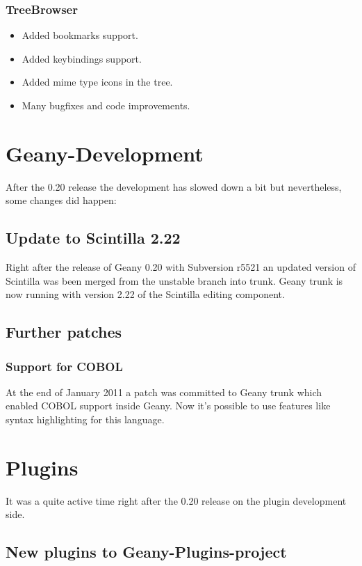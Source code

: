 \documentclass[%
paper=a4,%
fontsize=12pt,%
twoside=false,%
DIV18,
headsepline,
plainheadsepline,
footsepline,
plainfootsepline,
parskip=half,%
openany,%
]{scrartcl}
\begin{document}
\subsubsection{TreeBrowser}
\begin{itemize}
	\item Added bookmarks support.
	\item Added keybindings support.
	\item Added mime type icons in the tree.
	\item Many bugfixes and code improvements.
\end{itemize}

\section{Geany-Development}

After the 0.20 release the development has slowed down a bit but
nevertheless, some changes did happen:

\subsection{Update to Scintilla 2.22}

Right after the release of Geany 0.20 with Subversion r5521 an
updated version of Scintilla was been merged from the unstable branch
into trunk. Geany trunk is now running with version 2.22 of
the Scintilla editing component.

\subsection{Further patches}
\subsubsection{Support for COBOL}

At the end of January 2011 a patch was committed to Geany trunk which
enabled COBOL support inside Geany. Now it's possible to use
features like syntax highlighting for this language.


\section{Plugins}

It was a quite active time right after the 0.20 release on the plugin
development side.

\subsection{New plugins to Geany-Plugins-project}
\end{document}
